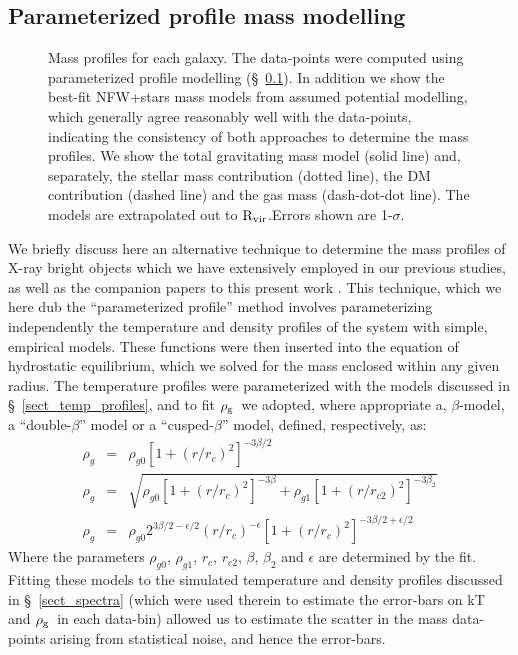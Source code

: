 \documentclass{emulateapj}
\def \eg {e.g.}
\newcommand{\rhog}{${\rm \rho_g}$}
\newcommand{\rvir }{${\rm R_{vir}}$}
\begin{document}
\subsection{Parameterized profile mass modelling} \label{sect_xmass}
\begin{figure}
\centering
\caption{Mass profiles for each galaxy. The data-points were computed
using parameterized profile modelling (\S~\ref{sect_xmass}).
In addition we show the best-fit NFW+stars mass models from assumed potential
modelling, which generally agree reasonably well with the data-points,
indicating the consistency of both approaches to determine the mass
profiles. We show the total gravitating mass model (solid line)
and, separately, the stellar mass contribution (dotted line),
the DM contribution (dashed line) and the gas mass (dash-dot-dot line). 
The models are extrapolated
out to \rvir.Errors shown are 1-$\sigma$.}
\label{fig_mass}
\end{figure}
We briefly discuss here an alternative technique to determine the 
mass profiles of X-ray bright objects which we have extensively
employed in our previous studies, as well as the companion
papers to this present work 
\citep[\eg][]{lewis03a,buote06a,gastaldello06a,zappacosta06a}.
This technique, which we here dub the ``parameterized profile'' method
involves parameterizing independently the temperature and density 
profiles of the system with simple, empirical models. These functions
were then inserted into the equation of hydrostatic equilibrium,
which we solved for the mass enclosed within any given radius.
The temperature profiles were parameterized with the models
discussed in \S~\ref{sect_temp_profiles}, and to fit \rhog\ we 
adopted, where appropriate a, $\beta$-model, a ``double-$\beta$'' model
or a ``cusped-$\beta$'' model, defined, respectively, as:
\begin{eqnarray}
\rho_g & = & \rho_{g0} \left[ 1+ (r/r_c)^2 \right]^{-3\beta /2} \label{eqn_beta}\\
\rho_g & = & \sqrt{\rho_{g0} \left[ 1+ (r/r_c)^2 \right]^{-3\beta} + \rho_{g1} \left[ 1+ (r/r_{c2})^2 \right]^{-3\beta_2}} \label{eqn_twobeta} \\
\rho_g & = & \rho_{g0} 2^{3\beta/2-\epsilon/2}(r/r_c)^{-\epsilon}\left[ 1+ (r/r_c)^2 \right]^{-3\beta /2+\epsilon/2} \label{eqn_cusp}
\end{eqnarray}
Where the parameters $\rho_{g0}$, $\rho_{g1}$, $r_c$, $r_{c2}$,
$\beta$, $\beta_2$ and $\epsilon$ are determined by the fit.
Fitting these models to the simulated temperature and density profiles 
discussed in \S~\ref{sect_spectra} (which were used therein to estimate the 
error-bars on kT and \rhog\ in each data-bin) allowed us to estimate the
scatter in the mass data-points arising from statistical noise, and
hence the error-bars. %
\end{document}

